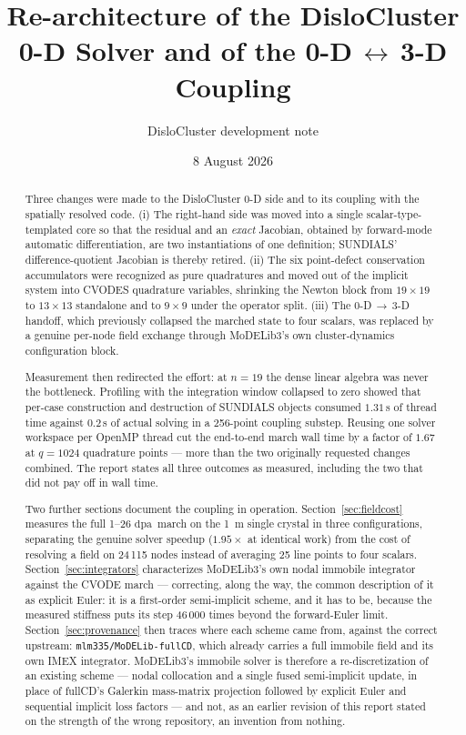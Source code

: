 \documentclass[11pt,a4paper]{article}
\title{\bfseries Re-architecture of the DisloCluster 0-D Solver and of the
       0-D\,$\leftrightarrow$\,3-D Coupling}
\author{DisloCluster development note}
\date{8 August 2026}
\newcommand{\code}[1]{\texttt{\small #1}}
\newcommand{\dpa}{\ensuremath{\mathrm{dpa}}}
\begin{document}
\maketitle

\begin{abstract}
\noindent
Three changes were made to the DisloCluster 0-D side and to its coupling with
the spatially resolved code. (i) The right-hand side was moved into a single
scalar-type-templated core so that the residual and an \emph{exact} Jacobian,
obtained by forward-mode automatic differentiation, are two instantiations of
one definition; SUNDIALS' difference-quotient Jacobian is thereby retired.
(ii) The six point-defect conservation accumulators were recognized as pure
quadratures and moved out of the implicit system into CVODES quadrature
variables, shrinking the Newton block from $19\times19$ to $13\times13$
standalone and to $9\times9$ under the operator split. (iii) The 0-D\,$\to$\,3-D
handoff, which previously collapsed the marched state to four scalars, was
replaced by a genuine per-node field exchange through MoDELib3's own
cluster-dynamics configuration block.

Measurement then redirected the effort: at $n=19$ the dense linear algebra was
never the bottleneck. Profiling with the integration window collapsed to zero
showed that per-case construction and destruction of SUNDIALS objects consumed
$1.31\,$s of thread time against $0.2\,$s of actual solving in a 256-point
coupling substep. Reusing one solver workspace per OpenMP thread cut the
end-to-end march wall time by a factor of $1.67$ at $q=1024$ quadrature points
--- more than the two originally requested changes combined. The report states
all three outcomes as measured, including the two that did not pay off in wall
time.

Two further sections document the coupling in operation.
Section~\ref{sec:fieldcost} measures the full 1--26 \dpa\ march on the
1~\textmu m single crystal in three configurations, separating the genuine
solver speedup ($1.95\times$ at identical work) from the cost of resolving a
field on 24\,115 nodes instead of averaging 25 line points to four scalars.
Section~\ref{sec:integrators} characterizes MoDELib3's own nodal immobile
integrator against the CVODE march --- correcting, along the way, the common
description of it as explicit Euler: it is a first-order semi-implicit scheme,
and it has to be, because the measured stiffness puts its step 46\,000 times
beyond the forward-Euler limit. Section~\ref{sec:provenance} then traces where
each scheme came from, against the correct upstream:
\code{mlm335/MoDELib-fullCD}, which already carries a full immobile field and
its own IMEX integrator. MoDELib3's immobile solver is therefore a
re-discretization of an existing scheme --- nodal collocation and a single fused
semi-implicit update, in place of fullCD's Galerkin mass-matrix projection
followed by explicit Euler and sequential implicit loss factors --- and not,
as an earlier revision of this report stated on the strength of the wrong
repository, an invention from nothing.


\end{abstract}
\end{document}
